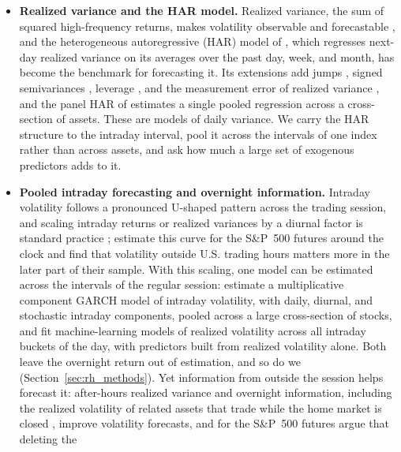 \begin{itemize}
\item \textbf{Realized variance and the HAR model.} Realized variance, the sum of squared high-frequency returns,
  makes volatility observable and forecastable \citep{AndersenBollerslevDieboldLabys2003,
  BarndorffNielsenShephard2002}, and the heterogeneous autoregressive (HAR) model of \citet{Corsi2009}, which
  regresses next-day realized variance on its averages over the past day, week, and month, has become the benchmark
  for forecasting it. Its extensions add jumps \citep{AndersenBollerslevDiebold2007}, signed semivariances
  \citep{PattonSheppard2015}, leverage \citep{CorsiReno2012}, and the measurement error of realized variance
  \citep{BollerslevPattonQuaedvlieg2016}, and the panel HAR of \citet{BollerslevHoodHussLebedev2018} estimates a
  single pooled regression across a cross-section of assets. These are models of daily variance. We carry the HAR
  structure to the intraday interval, pool it across the intervals of one index rather than across assets, and ask
  how much a large set of exogenous predictors adds to it.
\item \textbf{Pooled intraday forecasting and overnight information.} Intraday volatility follows a pronounced
  U-shaped pattern across the trading session, and scaling intraday returns or realized variances by a diurnal
  factor is standard practice \citep{AndersenBollerslev1997,TaylorXu1997}; \citet{AndersenSuTodorovZhang2024}
  estimate this curve for the S\&P~500 futures around the clock and find that volatility outside U.S. trading hours
  matters more in the later part of their sample. With this scaling, one model can be estimated across the intervals
  of the regular session: \citet{EngleSokalska2012} estimate a multiplicative component GARCH model of intraday
  volatility, with daily, diurnal, and stochastic intraday components, pooled across a large cross-section of
  stocks, and \citet{ZhangZhangCucuringuQian2024} fit machine-learning models of realized volatility across all
  intraday buckets of the day, with predictors built from realized volatility alone. Both leave the overnight return
  out of estimation, and so do we (Section~\ref{sec:rh_methods}). Yet information from outside the session helps
  forecast it: after-hours realized variance \citep{ChenYuZivot2012} and overnight information, including the
  realized volatility of related assets that trade while the home market is closed \citep{TodorovaSoucek2014},
  improve volatility forecasts, and for the S\&P~500 futures \citet{StroudJohannes2014} argue that deleting the

\end{itemize}
